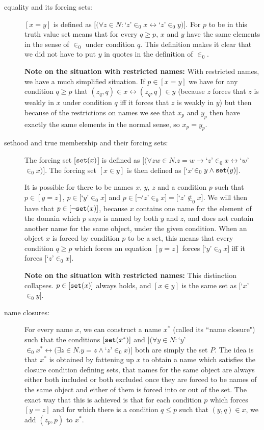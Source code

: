 \documentclass[12pt]{book}
\begin{document}
\begin{description}
\item[equality and its forcing sets:]  $[x = y]$ is defined as $[(\forall z\in N:$`$z$'$ \in_0 x \leftrightarrow$`$ z$'$ \in_0 y)]$.  For $p$ to be in this truth value set  means that for every $q \geq p$,
$x$ and $y$ have the same elements in the sense of $\in_0$ under condition $q$.  This definition makes it clear that we did not have to put $y$ in quotes in the definition of $\in_0$.

{\bf Note on the situation with restricted names:}  With restricted names, we have a much simplified situation.  If $p \in [x=y]$ we have for any condition $q \geq p$ that
$(z_q,q) \in x \leftrightarrow (z_q,q) \in y$ (because $z$ forces that $z$ is weakly in $x$ under condition $q$ iff it forces that $z$ is weakly in $y$) but then because of the restrictions on names we see that $x_p$ and $y_p$ then have exactly the same elements in the normal sense, so $x_p=y_p$.

\item[sethood and true membership and their forcing sets:]  The forcing set [${\tt set}(x)$] is defined as $[(\forall zw\in N. z=w \rightarrow $`$z$'$ \in_0 x \leftrightarrow $`$w $'$\in_0 x)]$.   The forcing set $[x \in y]$ is then defined as $[$`$x$'$ \in_0 y \wedge {\tt set}(y)]$.

It is possible for there to be names $x$, $y$, $z$ and a condition $p$ such that $p \in [y=z]$, $p \in [$`$y$'$ \in_0 x]$ and $p \in [\neg $`$z$'$ \in_0 x] = [$`$z$'$ \not\in_0 x]$.  We will then have that $p \in [\neg{\tt set}(x)]$, because $x$ contains one name for the element of the domain which $p$ says is named by both $y$ and $z$, and does not contain another name for the same object, under the given condition.  When an object $x$ is forced by condition $p$ to be a set,
this means that every condition $q \geq p$ which forces an equation $[y=z]$ forces $[$`$y$'$ \in_0 x]$ iff it forces $[$`$z$'$ \in_0 x]$.

{\bf Note on the situation with restricted names:}  This distinction collapses.  $p \in [{\tt set}(x)]$ always holds, and $[x \in y]$ is the same set as $[$`$x$'$ \in_0 y]$.

\item[name closures:]  For every name $x$, we can construct a name $x^*$ (called its ``name closure") such that the conditions $[{\tt set}(x^*)]$
and $[(\forall y \in N:$`$y$'$\in_0 x^* \leftrightarrow (\exists z\in N.y=z \wedge$`$ z$'$\in_0 x)]$ both are simply the set $P$.  The idea is that $x^*$ is obtained by fattening up $x$ to obtain a name which satisfies the closure condition defining sets, that names for the same object are always either both included or both excluded once they are forced to be names of the same object and either of them is forced into or out of the set.  The exact
way that this is achieved is that for each condition $p$ which forces $[y=z]$ and for which there is a condition $q \leq p$ such that $(y,q) \in x$, we
add $(z_p,p)$ to $x^*$.


\end{description}
\end{document}
